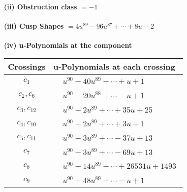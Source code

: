 \documentclass[1p]{elsarticle_modified}
\theoremstyle{definition}
\begin{document}
\flushleft \textbf{(ii) Obstruction class $= -1$}\\~\\
\flushleft \textbf{(iii) Cusp Shapes $= 4 u^{89}-96 u^{87}+\cdots+8 u-2$}\\~\\
\newpage\renewcommand{\arraystretch}{1}
\flushleft \textbf{(iv) u-Polynomials at the component}\newline \\
\begin{tabular}{m{50pt}|m{274pt}}
Crossings & \hspace{64pt}u-Polynomials at each crossing \\
\hline $$\begin{aligned}c_{1}\end{aligned}$$&$\begin{aligned}
&u^{90}+40 u^{89}+\cdots+u+1
\end{aligned}$\\
\hline $$\begin{aligned}c_{2},c_{6}\end{aligned}$$&$\begin{aligned}
&u^{90}-20 u^{88}+\cdots- u+1
\end{aligned}$\\
\hline $$\begin{aligned}c_{3},c_{12}\end{aligned}$$&$\begin{aligned}
&u^{90}+2 u^{89}+\cdots+35 u+25
\end{aligned}$\\
\hline $$\begin{aligned}c_{4},c_{10}\end{aligned}$$&$\begin{aligned}
&u^{90}+2 u^{89}+\cdots+3 u+1
\end{aligned}$\\
\hline $$\begin{aligned}c_{5},c_{11}\end{aligned}$$&$\begin{aligned}
&u^{90}+3 u^{89}+\cdots-37 u+13
\end{aligned}$\\
\hline $$\begin{aligned}c_{7}\end{aligned}$$&$\begin{aligned}
&u^{90}-3 u^{89}+\cdots-69 u+13
\end{aligned}$\\
\hline $$\begin{aligned}c_{8}\end{aligned}$$&$\begin{aligned}
&u^{90}+14 u^{89}+\cdots+26531 u+1493
\end{aligned}$\\
\hline $$\begin{aligned}c_{9}\end{aligned}$$&$\begin{aligned}
&u^{90}-48 u^{89}+\cdots- u+1
\end{aligned}$\\
\hline
\end{tabular}\\~\\
\end{document}
